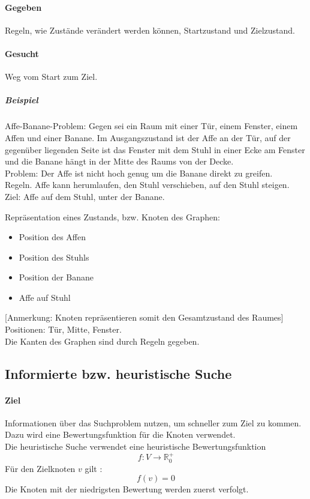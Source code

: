 \documentclass[a4paper]{scrartcl}
\begin{document}
\paragraph{Gegeben} Regeln, wie Zustände verändert werden können,
Startzustand und Zielzustand.
\paragraph{Gesucht} Weg vom Start zum Ziel.
\subparagraph{Beispiel} Affe-Banane-Problem: Gegen sei ein Raum mit einer Tür, einem Fenster, einem Affen und einer Banane. Im Ausgangszustand ist der Affe an der Tür, auf der gegenüber liegenden Seite ist das Fenster mit dem Stuhl in einer Ecke am Fenster und die Banane hängt in der Mitte des Raums von der Decke.\\
Problem: Der Affe ist nicht hoch genug um die Banane direkt zu greifen.\\
Regeln. Affe kann herumlaufen, den Stuhl verschieben, auf den Stuhl steigen.\\
Ziel: Affe auf dem Stuhl, unter der Banane.

Repräsentation eines Zustands, bzw. Knoten des Graphen:
\begin{itemize}
\item Position des Affen
\item Position des Stuhls
\item Position der Banane
\item Affe auf Stuhl
\end{itemize} [Anmerkung: Knoten repräsentieren somit den Gesamtzustand des Raumes]\\
Positionen: Tür, Mitte, Fenster.\\
Die Kanten des Graphen sind durch Regeln gegeben.

\subsection{Informierte bzw. heuristische Suche}
\paragraph{Ziel} Informationen über das Suchproblem nutzen, um schneller zum Ziel zu kommen. Dazu wird eine Bewertungsfunktion für die Knoten verwendet.\\
Die heuristische Suche verwendet eine heuristische Bewertungsfunktion \[ f: V \rightarrow \mathbb{R}_0^+ \]
Für den Zielknoten $v$ gilt : \[ f(v) = 0\] Die Knoten mit der niedrigsten Bewertung werden zuerst verfolgt.
\end{document}
